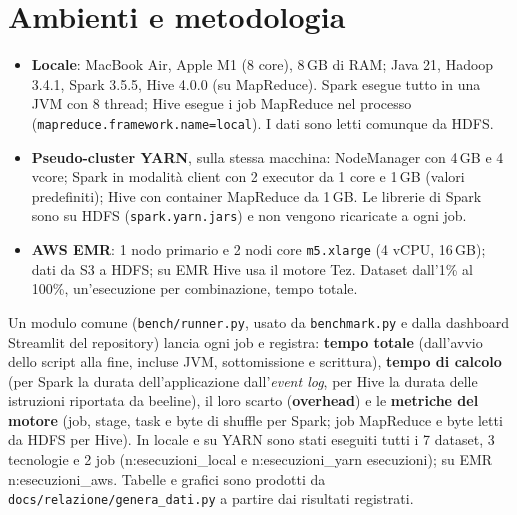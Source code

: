 \documentclass[11pt,a4paper]{article}
\newcommand{\N}[1]{\csname n:#1\endcsname}
\newcommand{\code}[1]{\texttt{#1}}
\begin{document}
\begin{table}[H]
\centering\small

\caption{Dataset usati negli esperimenti.}
\label{tab:dataset}
\end{table}

\section{Ambienti e metodologia}\label{sec:ambienti}
\begin{itemize}
  \item \textbf{Locale}: MacBook Air, Apple M1 (8 core), 8\,GB di RAM; Java 21, Hadoop 3.4.1, Spark 3.5.5,
        Hive 4.0.0 (su MapReduce). Spark esegue tutto in una JVM con 8 thread; Hive esegue i job MapReduce nel
        processo (\code{mapreduce.framework.name=local}). I dati sono letti comunque da HDFS.
  \item \textbf{Pseudo-cluster YARN}, sulla stessa macchina: NodeManager con 4\,GB e 4 vcore; Spark in modalità client
        con 2 executor da 1 core e 1\,GB (valori predefiniti); Hive con container MapReduce da 1\,GB. Le librerie di
        Spark sono su HDFS (\code{spark.yarn.jars}) e non vengono ricaricate a ogni job.
  \item \textbf{AWS EMR}: 1 nodo primario e 2 nodi core \code{m5.xlarge} (4 vCPU, 16\,GB); dati da S3 a HDFS; su EMR
        Hive usa il motore Tez. Dataset dall'1\% al 100\%, un'esecuzione per combinazione, tempo totale.
\end{itemize}
Un modulo comune (\code{bench/runner.py}, usato da \code{benchmark.py} e dalla dashboard Streamlit del repository)
lancia ogni job e registra: \textbf{tempo totale} (dall'avvio dello script alla fine, incluse JVM, sottomissione e
scrittura), \textbf{tempo di calcolo} (per Spark la durata dell'applicazione dall'\emph{event log}, per Hive la
durata delle istruzioni riportata da beeline), il loro scarto (\textbf{overhead}) e le \textbf{metriche del motore}
(job, stage, task e byte di shuffle per Spark; job MapReduce e byte letti da HDFS per Hive). In locale e su YARN
sono stati eseguiti tutti i 7 dataset, 3 tecnologie e 2 job (\N{esecuzioni_local} e \N{esecuzioni_yarn}
esecuzioni); su EMR \N{esecuzioni_aws}. Tabelle e grafici sono prodotti da \code{docs/relazione/genera\_dati.py}
a partire dai risultati registrati.
\end{document}
